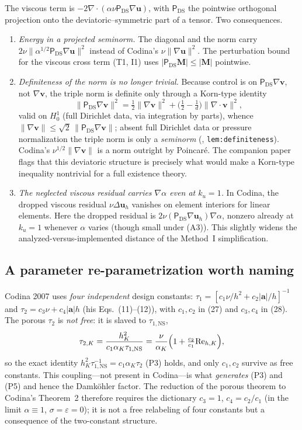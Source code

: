 \documentclass[11pt]{article}
\theoremstyle{remark}
\newcommand{\bu}{\boldsymbol{u}}
\newcommand{\bv}{\boldsymbol{v}}
\newcommand{\ba}{\boldsymbol{a}}
\newcommand{\ViscProj}{\mathsf{P}_{\mathrm{DS}}}
\newcommand{\norm}[1]{\lVert #1 \rVert}
\newcommand{\tns}{\tau_{1,\mathrm{NS}}}
\newcommand{\Reh}{\mathrm{Re}_{h,K}}
\begin{document}
The viscous term is $-2\nabla\cdot(\alpha\nu\ViscProj\nabla\bu)$, with $\ViscProj$ the
pointwise orthogonal projection onto the deviatoric--symmetric part of a tensor. Two
consequences.
\begin{enumerate}[leftmargin=1.5em,itemsep=0.3ex]
\item \emph{Energy in a projected seminorm.} The diagonal and the norm carry
$2\nu\norm{\alpha^{1/2}\ViscProj\nabla\bu}^2$ instead of Codina's $\nu\norm{\nabla\bu}^2$.
The perturbation bound for the viscous cross term (T1, I1) uses $|\ViscProj\boldsymbol M|\le|\boldsymbol M|$
pointwise.
\item \emph{Definiteness of the norm is no longer trivial.} Because control is on
$\ViscProj\nabla\bv$, not $\nabla\bv$, the triple norm is definite only through a
Korn-type identity
\[
  \norm{\ViscProj\nabla\bv}^2=\tfrac12\norm{\nabla\bv}^2+\bigl(\tfrac12-\tfrac1d\bigr)\norm{\nabla\cdot\bv}^2,
\]
valid on $H^1_0$ (full Dirichlet data, via integration by parts), whence
$\norm{\nabla\bv}\le\sqrt2\,\norm{\ViscProj\nabla\bv}$; absent full Dirichlet data or
pressure normalization the triple norm is only a \emph{seminorm} (\cite{osgsnote},
\texttt{lem:definiteness}). Codina's $\nu^{1/2}\norm{\nabla\bv}$ is a norm outright by
Poincar\'e. The companion paper flags that this deviatoric structure is precisely what
would make a Korn-type inequality nontrivial for a full existence theory.
\item \emph{The neglected viscous residual carries $\nabla\alpha$ even at $k_u=1$.} In Codina,
the dropped viscous residual $\nu\Delta\bu_h$ vanishes on element interiors for linear
elements. Here the dropped residual is $2\nu(\ViscProj\nabla\bu_h)\nabla\alpha$, nonzero
already at $k_u=1$ whenever $\alpha$ varies (though small under (A3)). This slightly widens
the analyzed-versus-implemented distance of the Method~I simplification.
\end{enumerate}

\subsection{A parameter re-parametrization worth naming}
\label{sec:params}

Codina 2007 uses \emph{four independent} design constants: $\tau_1=[c_1\nu/h^2+c_2|\ba|/h]^{-1}$
and $\tau_2=c_3\nu+c_4|\ba|h$ (his Eqs.~(11)--(12)), with $c_1,c_2$ in (27) and
$c_3,c_4$ in (28). The porous $\tau_2$ is \emph{not free}: it is slaved to $\tns$,
\[
  \tau_{2,K}=\frac{h_K^2}{c_1\alpha_K\tns}=\frac{\nu}{\alpha_K}\Bigl(1+\tfrac{c_2}{c_1}\Reh\Bigr),
\]
so the exact identity $h_K^2\tns^{-1}=c_1\alpha_K\tau_2$ (P3) holds, and only $c_1,c_2$
survive as free constants. This coupling---not present in Codina---is what \emph{generates}
(P3) and (P5) and hence the Damk\"ohler factor. The reduction of the porous theorem to
Codina's Theorem~2 therefore requires the dictionary $c_3=1$, $c_4=c_2/c_1$ (in the limit
$\alpha\equiv1$, $\sigma=\varepsilon=0$); it is not a free relabeling of four constants but
a consequence of the two-constant structure.
\end{document}
